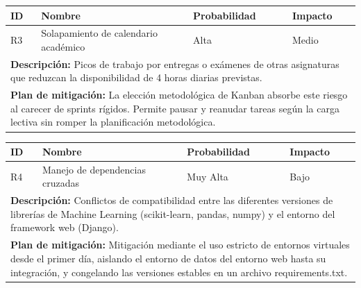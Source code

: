 \vspace{0.3cm}

\begin{center}
\small
\begin{tabular}{|p{}|p{}|p{}|p{}|}
\hline
\textbf{ID} & \textbf{Nombre} & \textbf{Probabilidad} & \textbf{Impacto} \\
\hline
R3 & Solapamiento de calendario académico & Alta & Medio \\
\hline
\multicolumn{4}{|p{0.9\textwidth}|}{\textbf{Descripción:} Picos de trabajo por entregas o exámenes de otras asignaturas que reduzcan la disponibilidad de 4 horas diarias previstas.} \\
\hline
\multicolumn{4}{|p{0.9\textwidth}|}{\textbf{Plan de mitigación:} La elección metodológica de Kanban absorbe este riesgo al carecer de sprints rígidos. Permite pausar y reanudar tareas según la carga lectiva sin romper la planificación metodológica.} \\
\hline
\end{tabular}
\end{center}

\vspace{0.3cm}

\begin{center}
\small
\begin{tabular}{|p{}|p{}|p{}|p{}|}
\hline
\textbf{ID} & \textbf{Nombre} & \textbf{Probabilidad} & \textbf{Impacto} \\
\hline
R4 & Manejo de dependencias cruzadas & Muy Alta & Bajo \\
\hline
\multicolumn{4}{|p{0.9\textwidth}|}{\textbf{Descripción:} Conflictos de compatibilidad entre las diferentes versiones de librerías de Machine Learning (scikit-learn, pandas, numpy) y el entorno del framework web (Django).} \\
\hline
\multicolumn{4}{|p{0.9\textwidth}|}{\textbf{Plan de mitigación:} Mitigación mediante el uso estricto de entornos virtuales desde el primer día, aislando el entorno de datos del entorno web hasta su integración, y congelando las versiones estables en un archivo requirements.txt.} \\
\hline
\end{tabular}
\end{center}

\vspace{0.3cm}

